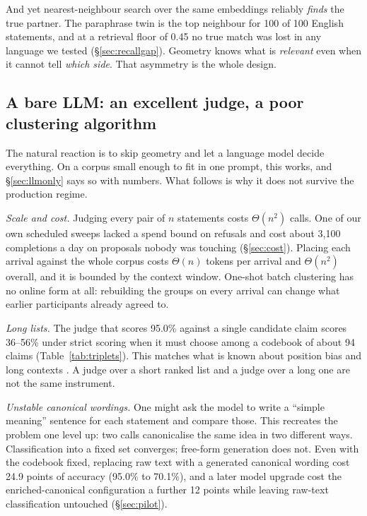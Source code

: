 \documentclass{article}
\begin{document}
And yet nearest-neighbour search over the same embeddings reliably \emph{finds} the true partner. The paraphrase twin is the top neighbour for 100 of 100 English statements, and at a retrieval floor of 0.45 no true match was lost in any language we tested (\S\ref{sec:recallgap}). Geometry knows what is \emph{relevant} even when it cannot tell \emph{which side}. That asymmetry is the whole design.

\subsection{A bare LLM: an excellent judge, a poor clustering algorithm}
\label{sec:whynotllm}

The natural reaction is to skip geometry and let a language model decide everything. On a corpus small enough to fit in one prompt, this works, and \S\ref{sec:llmonly} says so with numbers. What follows is why it does not survive the production regime.

\emph{Scale and cost.} Judging every pair of $n$ statements costs $\Theta(n^2)$ calls. One of our own scheduled sweeps lacked a spend bound on refusals and cost about 3{,}100 completions a day on proposals nobody was touching (\S\ref{sec:cost}). Placing each arrival against the whole corpus costs $\Theta(n)$ tokens per arrival and $\Theta(n^2)$ overall, and it is bounded by the context window. One-shot batch clustering has no online form at all: rebuilding the groups on every arrival can change what earlier participants already agreed to.

\emph{Long lists.} The judge that scores 95.0\% against a single candidate claim scores 36--56\% under strict scoring when it must choose among a codebook of about 94 claims (Table~\ref{tab:triplets}). This matches what is known about position bias and long contexts \citep{liu2024lost,wang2023large}. A judge over a short ranked list and a judge over a long one are not the same instrument.

\emph{Unstable canonical wordings.} One might ask the model to write a ``simple meaning'' sentence for each statement and compare those. This recreates the problem one level up: two calls canonicalise the same idea in two different ways. Classification into a fixed set converges; free-form generation does not. Even with the codebook fixed, replacing raw text with a generated canonical wording cost 24.9 points of accuracy (95.0\% to 70.1\%), and a later model upgrade cost the enriched-canonical configuration a further 12 points while leaving raw-text classification untouched (\S\ref{sec:pilot}).
\end{document}
